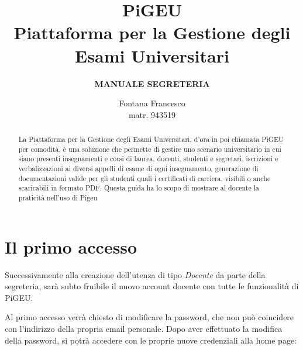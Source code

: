 \documentclass{article}
\title{PiGEU\\ Piattaforma per la Gestione degli Esami Universitari}
\author{\textbf{MANUALE SEGRETERIA}}
\date{Fontana Francesco \\ matr. 943519}
\begin{document}
    \maketitle

    \begin{abstract}

        La Piattaforma per la Gestione degli Esami Universitari, d'ora in poi chiamata PiGEU per comodità, è una soluzione che permette di gestire
        uno scenario universitario in cui siano presenti insegnamenti e corsi di laurea, docenti, studenti e segretari, iscrizioni e verbalizzazioni
        ai diversi appelli di esame di ogni insegnamento, generazione di documentazioni valide per gli studenti quali i certificati di carriera, visibili
        o anche scaricabili in formato PDF.
        Questa guida ha lo scopo di mostrare al docente la praticità nell'uso di Pigeu
    \end{abstract}

    \tableofcontents

    \section{Il primo accesso}
    Successivamente alla creazione dell'utenza di tipo \textit{Docente} da parte della segreteria, sarà subto fruibile il nuovo account docente con tutte le funzionalità di PiGEU.

    Al primo accesso verrà chiesto di modificare la password, che non può coincidere con l'indirizzo della propria email personale. Dopo aver effettuato la modifica della password, si potrà accedere con le proprie nuove credenziali alla home page:
\end{document}
